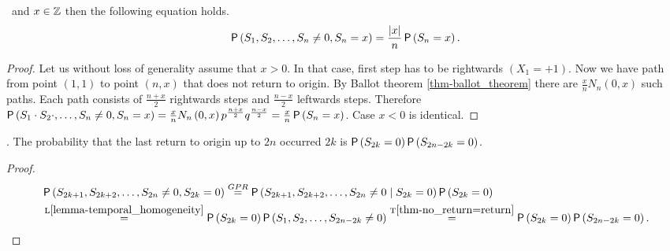\begin{thm}\label{thm-probability_position_b_at_time_n_without_return_origin}
 \Lrw\ and $x \in \mathbb{Z}$ then the following equation holds.
 \[\operatorname{\mathsf{P}} \left( S_1, S_2, \ldots, S_{n}\neq 0, S_n=x \right)
 =\frac{\left|{x}\right|}{n}\operatorname{\mathsf{P}} \left( S_n=x \right).
 \]
\end{thm}
\begin{proof}
 Let us without loss of generality assume that $x>0$. In that case, first step has to be rightwards $\left(X_1=+1\right).$ Now we have path from point $ \left( 1,1 \right) $ to point $ \left( n,x \right) $ that does not return to origin.
 By Ballot theorem \ref{thm-ballot_theorem} there are $\frac{x}{n}N_n \left( 0,x \right) $ such paths. Each path consists of $\frac{n+x}{2}$ rightwards steps and $\frac{n-x}{2}$ leftwards steps.
 Therefore $\operatorname{\mathsf{P}} \left( S_1\cdot S_2 \cdot, \ldots, S_n\neq 0, S_n=x \right)
 =\frac{x}{n}N_n \left( 0,x \right) p^{\frac{n+x}{2}}q^{\frac{n-x}{2}}
 =\frac{x}{n}\operatorname{\mathsf{P}} \left( S_n=x \right) $. Case $x<0$ is identical.
\end{proof}

\begin{thm}\label{thm-return_origin_upto_time}
 \Lrws. The probability that the last return to origin up to \Time $2n$ occurred \intime $2k$
 is $\operatorname{\mathsf{P}} \left( S_{2k}=0 \right) \operatorname{\mathsf{P}} \left( S_{2n-2k}=0 \right) $.
\end{thm}
\begin{proof}
 \[
  \begin{split}
     & \operatorname{\mathsf{P}} \left( S_{2k+1}, S_{2k+2}, \ldots, S_{2n} \neq 0, S_{2k}=0\right)
     \overset{GPR}{=}  \operatorname{\mathsf{P}} \left( S_{2k+1}, S_{2k+2}, \ldots, S_{2n}\neq 0 \mid S_{2k}=0 \right)\operatorname{\mathsf{P}} \left( S_{2k}=0 \right)\\
     & \overset{\text{L}\ref{lemma-temporal_homogeneity}}{=}\operatorname{\mathsf{P}} \left( S_{2k}=0 \right) \operatorname{\mathsf{P}} \left( S_{1}, S_{2}, \ldots, S_{2n-2k}\neq 0 \right)
     \overset{\text{T}\ref{thm-no_return=return}}{=}\operatorname{\mathsf{P}} \left( S_{2k}=0 \right) \operatorname{\mathsf{P}} \left( S_{2n-2k}=0 \right).
  \end{split}
 \]
\end{proof}

